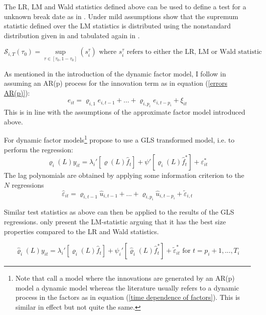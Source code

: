 \documentclass[12pt]{article}
\begin{document}
The LR, LM and Wald statistics defined above can be used to define a test for a unknown break date as in \citet{andrews1993tests}. Under mild assumptions \citet{breitung2011testing} show that the supremum statistic defined over the LM statistics is distributed using the nonstandard distribution given in \citet{andrews1993tests} and tabulated again in \citet{andrews2003tests}.

\begin{equation}
\label{sup LM statistic}
\mathscr{S}_{i,T}(\tau_0) = \sup_{\tau \in [\tau_0, 1-\tau_0]} (s_i^\tau) \text{ where $s_i^\tau$ refers to either the LR, LM or Wald statistic}
\end{equation}



As mentioned in the introduction of the dynamic factor model, I follow \citet{breitung2011testing} in assuming an AR(p) process for the innovation term as in equation (\ref{errors AR(p)}):
\begin{equation}
	\label{errors AR(p)}
	e_{it} = \varrho_{i, 1} e_{i, t-1} + ... + \varrho_{i, p_i} e_{i, t-p_i} + \xi_{it}
\end{equation}
This is in line with the assumptions of the approximate factor model introduced above.

For dynamic factor models\footnote{Note that \citet{breitung2011testing} call a model where the innovations are generated by an AR(p) model a dynamic model whereas the literature usually refers to a dynamic process in the factors as in equation (\ref{time dependence of factors}). This is similar in effect but not quite the same.} \citet{breitung2011testing} propose to use a GLS transformed model, i.e. to perform the regression:
$$\varrho_i(L) y_{it} = \lambda_i'[\varrho(L) \hat f_t] + \psi' [\varrho_i(L) \hat f_t^*] + \varepsilon^*_{it}$$
The lag polynomials are obtained by applying some information criterion to the $N$ regressions
$$\hat \varepsilon_{it} = \varrho_{i, t-1} \hat u_{i, t-1} + ... + \varrho_{i, p_i} \hat u_{i, t-p_i} + \tilde \varepsilon_{i,t}$$

Similar test statistics as above can then be applied to the results of the GLS regressions. \citet{breitung2011testing} only present the LM-statistic arguing that it has the best size properties compared to the LR and Wald statistics.

$$\hat \varrho_i(L) y_{it} = \lambda_i' \left[\varrho_i(L) \hat f_t\right] + \psi_i' \left[\hat \varrho_i(L) \hat f_t^*\right] + \tilde \varepsilon^*_{it} \text{ for } t= p_i+1, ..., T_i$$
\end{document}
